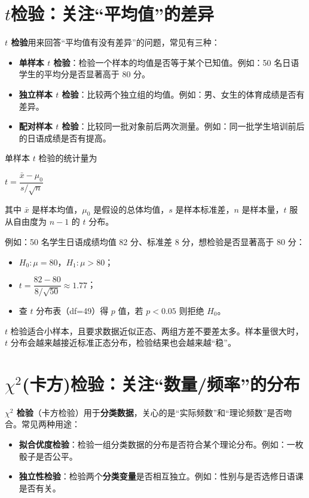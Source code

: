 \documentclass[lang=cn,10pt]{elegantbook}
\begin{document}
\section{$t$检验：关注“平均值”的差异}
\textbf{$t$ 检验}用来回答“平均值有没有差异”的问题，常见有三种：
\begin{itemize}
  \item \textbf{单样本 $t$ 检验}：检验一个样本的均值是否等于某个已知值。例如：50 名日语学生的平均分是否显著高于 80 分。
  \item \textbf{独立样本 $t$ 检验}：比较两个独立组的均值。例如：男、女生的体育成绩是否有差异。
  \item \textbf{配对样本 $t$ 检验}：比较同一批对象前后两次测量。例如：同一批学生培训前后的日语成绩是否有提高。
\end{itemize}

单样本 $t$ 检验的统计量为
\begin{center}
$t=\dfrac{\bar{x}-\mu_0}{s/\sqrt{n}}$
\end{center}
其中 $\bar{x}$ 是样本均值，$\mu_0$ 是假设的总体均值，$s$ 是样本标准差，$n$ 是样本量，$t$ 服从自由度为 $n-1$ 的 $t$ 分布。

例如：50 名学生日语成绩均值 82 分、标准差 8 分，想检验是否显著高于 80 分：
\begin{itemize}
  \item $H_0:\mu=80$，$H_1:\mu>80$；
  \item $t=\dfrac{82-80}{8/\sqrt{50}}\approx1.77$；
  \item 查 $t$ 分布表（df=49）得 $p$ 值，若 $p<0.05$ 则拒绝 $H_0$。
\end{itemize}

\begin{remark}
$t$ 检验适合小样本，且要求数据近似正态、两组方差不要差太多。样本量很大时，$t$ 分布会越来越接近标准正态分布，检验结果也会越来越“稳”。
\end{remark}

\section{$\chi^2$(卡方)检验：关注“数量/频率”的分布}
\textbf{$\chi^2$ 检验}（卡方检验）用于\textbf{分类数据}，关心的是“实际频数”和“理论频数”是否吻合。常见两种用途：
\begin{itemize}
  \item \textbf{拟合优度检验}：检验一组分类数据的分布是否符合某个理论分布。例如：一枚骰子是否公平。
  \item \textbf{独立性检验}：检验两个\textbf{分类变量}是否相互独立。例如：性别与是否选修日语课是否有关。
\end{itemize}
\end{document}
